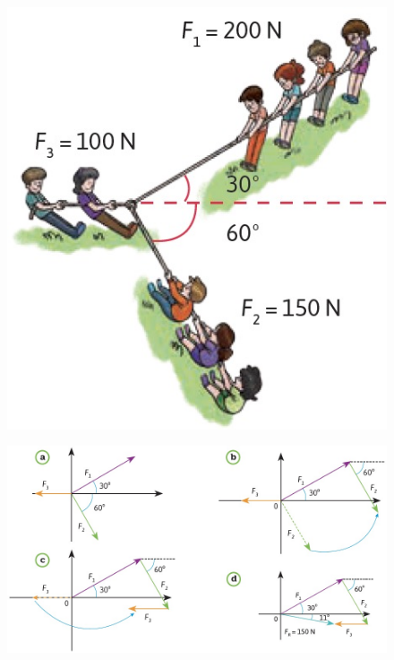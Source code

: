 \documentclass[11pt]{book}
\begin{document}
\begin{minipage}[t]{0.33\textwidth}
  \begin{figure}[H]
    \centering
    \includegraphics[width=\linewidth]{suma_ninios01.jpg}
    \label{fig:suma_ninios01}
  \end{figure}
\end{minipage}\hfill
\begin{minipage}[t]{0.65\textwidth}
  \begin{figure}[H]
    \centering
    \includegraphics[width=\linewidth]{suma_ninios02.jpg}
    \label{fig:suma_ninios02}
  \end{figure}
\end{minipage}\\
\end{document}
